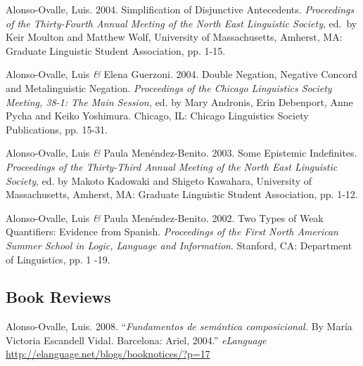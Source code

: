 \documentclass[11pt]{article}
\begin{document}
Alonso-Ovalle, Luis. 2004. Simplification of Disjunctive Antecedents. \textit{Proceedings of the Thirty-Fourth Annual Meeting of the North East Linguistic Society}, ed.\ by Keir Moulton and Matthew Wolf,  University of Massachusetts, Amherst, MA: Graduate Linguistic Student Association, pp. 1-15.


Alonso-Ovalle, Luis \textit{\&} Elena Guerzoni. 2004. Double Negation, Negative Concord and Metalinguistic Negation. \textit{Proceedings of the Chicago Linguistics Society Meeting, 38-1: The Main Session,} ed. by Mary Andronis, Erin Debenport, Anne Pycha and Keiko Yoshimura. Chicago, IL: Chicago Linguistics Society Publications, pp. 15-31.



Alonso-Ovalle, Luis \textit{\&} Paula Men\'endez-Benito. 2003. Some Epistemic Indefinites. \textit{Proceedings of the Thirty-Third Annual Meeting of the North East Linguistic Society}, ed. by Makoto Kadowaki and Shigeto Kawahara,  University of Massachusetts, Amherst, MA: Graduate Linguistic Student Association, pp. 1-12. 


Alonso-Ovalle, Luis \textit{\&} Paula Men\'endez-Benito. 2002. Two Types of Weak Quantifiers: Evidence from Spanish. \textit{Proceedings of the First North American Summer School in Logic, Language and Information}. Stanford, CA: Department of Linguistics, pp. 1 -19. 



\subsection*{Book Reviews}
Alonso-Ovalle, Luis. 2008. ``\textit{Fundamentos de sem\'antica composicional.} By Mar\'ia Victoria Escandell Vidal. Barcelona: Ariel, 2004.''  \textit{eLanguage} {\footnotesize \href{http://elanguage.net/blogs/booknotices/?p=17}{http://elanguage.net/blogs/booknotices/?p=17}}
\end{document}
